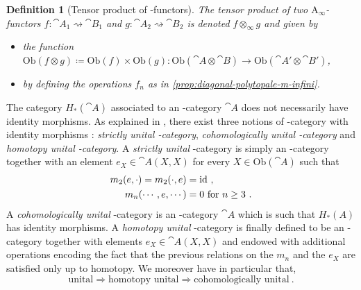 \documentclass[twoside, 12pt]{amsart}
\newtheorem{definition}{Definition}[section]
\theoremstyle{remark}
\begin{document}
\begin{definition}[Tensor product of \Ainf -functors]
The \emph{tensor product} of two $\mathrm{A}_\infty$-functors $f:\cat{A}_1 \rightsquigarrow \cat{B}_1$ and $g:\cat{A}_2 \rightsquigarrow \cat{B}_2$ is denoted $f\otimes_\infty g$ and given by 
\begin{itemize}[leftmargin=*]
\item the function $\mathrm{Ob}(f\otimes g)\coloneqq \mathrm{Ob}(f)\times \mathrm{Ob}(g) : \mathrm{Ob}(\cat{A}\otimes\cat{B}) \to \mathrm{Ob}(\cat{A}'\otimes\cat{B}')$,
\item by defining the operations $f_n$ as in \cref{prop:diagonal-polytopale-m-infini}.
\end{itemize}
\end{definition}

The category $H_*(\cat{A})$ associated to an \Ainf -category $\cat{A}$ does not necessarily have identity morphisms. As explained in \cite[Section 1.2]{Seidel08}, there exist three notions of \Ainf -category with identity morphisms : \textit{strictly unital \Ainf -category}, \textit{cohomologically unital \Ainf -category} and \textit{homotopy unital \Ainf -category}. 
A \textit{strictly unital} \Ainf -category is simply an \Ainf -category together with an element $e_X \in \cat{A} (X ,X )$ for every $X \in \mathrm{Ob}(\cat{A})$ such that \begin{align*}
m_2 (e , \cdot ) = m_2 (\cdot , e ) &= \mathrm{id} \ , \\
m_n ( \cdots , e , \cdots ) &= 0 \text { for } n \geq 3 \ .
\end{align*} 
A \textit{cohomologically unital} \Ainf -category is an \Ainf -category $\cat{A}$ which is such that $H_*(A)$ has identity morphisms.
A \textit{homotopy unital} \Ainf -category is finally defined to be an \Ainf -category together with elements $e_X \in \cat{A} (X ,X )$ and endowed with additional operations encoding the fact that the previous relations on the $m_n$ and the $e_X$ are satisfied only up to homotopy.
We moreover have in particular that,
\[  \text{unital} \Rightarrow \text{homotopy unital} \Rightarrow \text{cohomologically unital} \ . \]
\end{document}
